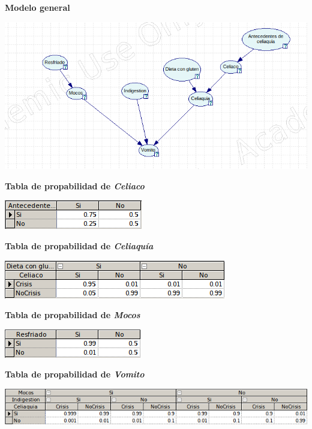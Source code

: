 \documentclass{article}
\begin{document}
\textbf{Modelo general}

\begin{center}
\includegraphics[scale=0.5]{Modelo1.png}
\end{center}

\newpage

\textbf{Tabla de propabilidad de \textit{Celiaco}}

\begin{center}
\includegraphics[scale=0.5]{Celiaco.png}
\end{center}

\textbf{Tabla de propabilidad de \textit{Celiaquía}}

\begin{center}
\includegraphics[scale=0.5]{Celiaquia.png}
\end{center}

\textbf{Tabla de propabilidad de \textit{Mocos}}

\begin{center}
\includegraphics[scale=0.5]{Mocos.png}
\end{center}


\textbf{Tabla de propabilidad de \textit{Vomito}}

\begin{center}
\includegraphics[scale=0.5]{Vomito.png}
\end{center}
\end{document}
